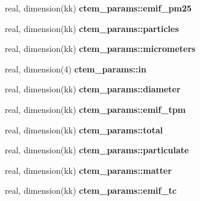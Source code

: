 \begin{DoxyCompactItemize}
\item 
\hypertarget{namespacectem__params_a89f38c6366d839a93b4cb499ecb49b6b}{}real, dimension(kk) {\bfseries ctem\+\_\+params\+::emif\+\_\+pm25}\label{namespacectem__params_a89f38c6366d839a93b4cb499ecb49b6b}

\item 
\hypertarget{namespacectem__params_a852562d26a2c890c08e567b78396298d}{}real, dimension(kk) {\bfseries ctem\+\_\+params\+::particles}\label{namespacectem__params_a852562d26a2c890c08e567b78396298d}

\item 
\hypertarget{namespacectem__params_add07052002c589520220c51ba57051cd}{}real, dimension(kk) {\bfseries ctem\+\_\+params\+::micrometers}\label{namespacectem__params_add07052002c589520220c51ba57051cd}

\item 
\hypertarget{namespacectem__params_a8359e4a8a044af631b583a64434f3bdf}{}real, dimension(4) {\bfseries ctem\+\_\+params\+::in}\label{namespacectem__params_a8359e4a8a044af631b583a64434f3bdf}

\item 
\hypertarget{namespacectem__params_a76ec8c542d430e394c06fe49e361712d}{}real, dimension(kk) {\bfseries ctem\+\_\+params\+::diameter}\label{namespacectem__params_a76ec8c542d430e394c06fe49e361712d}

\item 
\hypertarget{namespacectem__params_a963896fb7e7da4daecc87391c68c903e}{}real, dimension(kk) {\bfseries ctem\+\_\+params\+::emif\+\_\+tpm}\label{namespacectem__params_a963896fb7e7da4daecc87391c68c903e}

\item 
\hypertarget{namespacectem__params_a2b7d4f3b2f06702cc013e2c9ab1bf409}{}real, dimension(kk) {\bfseries ctem\+\_\+params\+::total}\label{namespacectem__params_a2b7d4f3b2f06702cc013e2c9ab1bf409}

\item 
\hypertarget{namespacectem__params_add7d3f17996315751c1e01649cab4996}{}real, dimension(kk) {\bfseries ctem\+\_\+params\+::particulate}\label{namespacectem__params_add7d3f17996315751c1e01649cab4996}

\item 
\hypertarget{namespacectem__params_a613c6d157fba0dd4745d1d0e5c96c355}{}real, dimension(kk) {\bfseries ctem\+\_\+params\+::matter}\label{namespacectem__params_a613c6d157fba0dd4745d1d0e5c96c355}

\item 
\hypertarget{namespacectem__params_a3c3f54dc0014275a3c519f419392bfc9}{}real, dimension(kk) {\bfseries ctem\+\_\+params\+::emif\+\_\+tc}\label{namespacectem__params_a3c3f54dc0014275a3c519f419392bfc9}


\end{DoxyCompactItemize}
